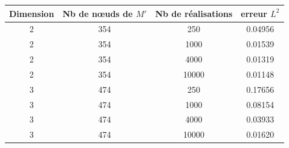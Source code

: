 \begin{table}[htbp]
\centering
\begin{tabular}{|c |c |c |c |}
\hline
Dimension & Nb de n\oe uds de $M'$ & Nb de réalisations  & erreur $L^2$ \\
\hline
2 & 354 & 250 & 0.04956   \\
\hline
2 & 354 & 1000 & 0.01539   \\
\hline
2 & 354 & 4000 & 0.01319    \\
\hline
2 & 354 & 10000 & 0.01148   \\
\hline
\hline
3 & 474 & 250 & 0.17656 \\ 
\hline
3 & 474 & 1000 & 0.08154 \\ 
\hline
3 & 474 & 4000 & 0.03933 \\ 
\hline
3 & 474 & 10000 & 0.01620 \\ 
\hline
\end{tabular}
\end{table}













